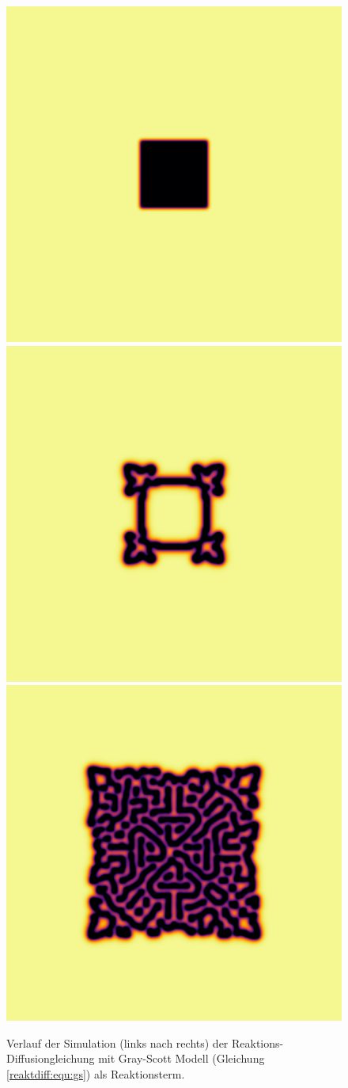 \begin{figure}
    \centering
    \includegraphics[width=0.32\linewidth]{papers/reaktdiff/images/GrayScott/gs_n1.png}
    \includegraphics[width=0.32\linewidth]{papers/reaktdiff/images/GrayScott/gs_n300.png}
    \includegraphics[width=0.32\linewidth]{papers/reaktdiff/images/GrayScott/gs_n999.png}
    \caption{Verlauf der Simulation (links nach rechts) der Reaktions-Diffusiongleichung mit Gray-Scott Modell (Gleichung \eqref{reaktdiff:equ:gs}) als Reaktionsterm.}
    \label{reaktdiff:fig:gs}
\end{figure}

